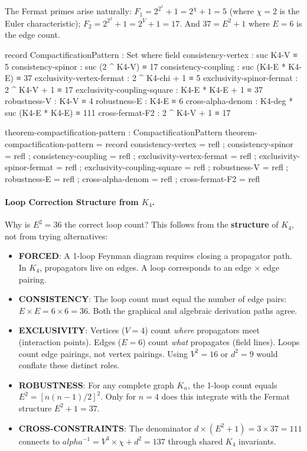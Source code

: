 \documentclass[11pt,a4paper]{book}
\def\alpha{alpha}%
\begin{document}
The Fermat primes arise naturally: $F_1 = 2^{2^1} + 1 = 2^\chi + 1 = 5$ (where $\chi = 2$ is the Euler characteristic); $F_2 = 2^{2^2} + 1 = 2^V + 1 = 17$. And $37 = E^2 + 1$ where $E = 6$ is the edge count.

\begin{code}
record CompactificationPattern : Set where
  field
    consistency-vertex : suc K4-V ≡ 5
    consistency-spinor : suc (2 ^ K4-V) ≡ 17
    consistency-coupling : suc (K4-E * K4-E) ≡ 37
    exclusivity-vertex-fermat : 2 ^ K4-chi + 1 ≡ 5
    exclusivity-spinor-fermat : 2 ^ K4-V + 1 ≡ 17
    exclusivity-coupling-square : K4-E * K4-E + 1 ≡ 37
    robustness-V : K4-V ≡ 4
    robustness-E : K4-E ≡ 6
    cross-alpha-denom : K4-deg * suc (K4-E * K4-E) ≡ 111
    cross-fermat-F2 : 2 ^ K4-V + 1 ≡ 17

theorem-compactification-pattern : CompactificationPattern
theorem-compactification-pattern = record
  { consistency-vertex = refl
  ; consistency-spinor = refl
  ; consistency-coupling = refl
  ; exclusivity-vertex-fermat = refl
  ; exclusivity-spinor-fermat = refl
  ; exclusivity-coupling-square = refl
  ; robustness-V = refl
  ; robustness-E = refl
  ; cross-alpha-denom = refl
  ; cross-fermat-F2 = refl
  }

\end{code}

\paragraph{Loop Correction Structure from $K_4$.}
Why is $E^2 = 36$ the correct loop count? This follows from the \textbf{structure}
of $K_4$, not from trying alternatives:

\begin{itemize}
\item \textbf{FORCED}: A 1-loop Feynman diagram requires closing a propagator path. In $K_4$,
  propagators live on edges. A loop corresponds to an edge $\times$ edge pairing.
\item \textbf{CONSISTENCY}: The loop count must equal the number of edge pairs:
  $E \times E = 6 \times 6 = 36$. Both the graphical and algebraic derivation paths agree.
\item \textbf{EXCLUSIVITY}: Vertices ($V=4$) count \emph{where} propagators meet (interaction points).
  Edges ($E=6$) count \emph{what} propagates (field lines). Loops count edge pairings, not
  vertex pairings. Using $V^2=16$ or $d^2=9$ would conflate these distinct roles.
\item \textbf{ROBUSTNESS}: For any complete graph $K_n$, the 1-loop count equals $E^2 = [n(n-1)/2]^2$.
  Only for $n=4$ does this integrate with the Fermat structure $E^2+1=37$.
\item \textbf{CROSS-CONSTRAINTS}: The denominator $d \times (E^2+1) = 3 \times 37 = 111$
  connects to $\alpha^{-1} = V^3 \times \chi + d^2 = 137$ through shared $K_4$ invariants.
\end{itemize}
\end{document}
